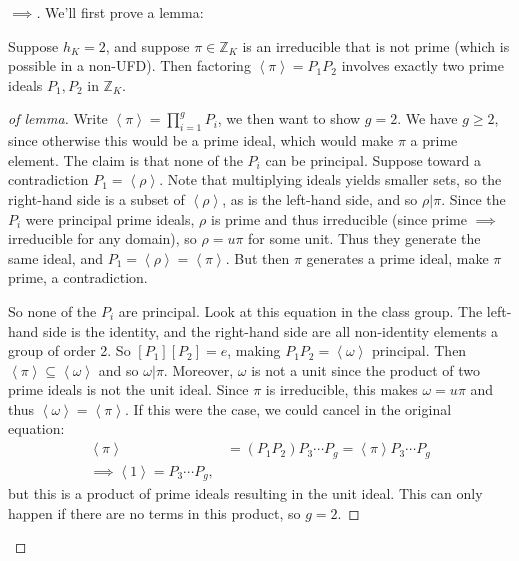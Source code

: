 \begin{proof}[$\implies$]

We'll first prove a lemma:

\begin{lemma}

Suppose \(h_K = 2\), and suppose \(\pi \in {\mathbb{Z}}_K\) is an
irreducible that is not prime (which is possible in a non-UFD). Then
factoring \(\left\langle{ \pi }\right\rangle = P_1 P_2\) involves
exactly two prime ideals \(P_1, P_2\) in \({\mathbb{Z}}_K\).

\end{lemma}

\begin{proof}[of lemma]

Write \(\left\langle{ \pi }\right\rangle= \prod_{i=1}^g P_i\), we then
want to show \(g=2\). We have \(g\geq 2\), since otherwise this would be
a prime ideal, which would make \(\pi\) a prime element. The claim is
that none of the \(P_i\) can be principal. Suppose toward a
contradiction \(P_1 = \left\langle{ \rho }\right\rangle\). Note that
multiplying ideals yields smaller sets, so the right-hand side is a
subset of \(\left\langle{ \rho }\right\rangle\), as is the left-hand
side, and so \(\rho \mathrel{\Big|}\pi\). Since the \(P_i\) were
principal prime ideals, \(\rho\) is prime and thus irreducible (since
prime \(\implies\) irreducible for any domain), so \(\rho = u \pi\) for
some unit. Thus they generate the same ideal, and
\(P_1 = \left\langle{ \rho }\right\rangle = \left\langle{ \pi }\right\rangle\).
But then \(\pi\) generates a prime ideal, make \(\pi\) prime, a
contradiction.

So none of the \(P_i\) are principal. Look at this equation in the class
group. The left-hand side is the identity, and the right-hand side are
all non-identity elements a group of order 2. So \([P_1][P_2] = e\),
making \(P_1 P_2 = \left\langle{ \omega }\right\rangle\) principal. Then
\(\left\langle{ \pi }\right\rangle\subseteq \left\langle{ \omega }\right\rangle\)
and so \(\omega \mathrel{\Big|}\pi\). Moreover, \(\omega\) is not a unit
since the product of two prime ideals is not the unit ideal. Since
\(\pi\) is irreducible, this makes \(\omega= u \pi\) and thus
\(\left\langle{ \omega }\right\rangle = \left\langle{ \pi }\right\rangle\).
If this were the case, we could cancel in the original equation:
\begin{align*}
\left\langle{ \pi }\right\rangle &= (P_1 P_2)P_3 \cdots P_g = \left\langle{ \pi }\right\rangle P_3 \cdots P_g   \\
\implies \left\langle{ 1 }\right\rangle = P_3 \cdots P_g 
,\end{align*}
but this is a product of prime ideals resulting in the unit ideal. This
can only happen if there are no terms in this product, so \(g=2\).


\end{proof}
\end{proof}
